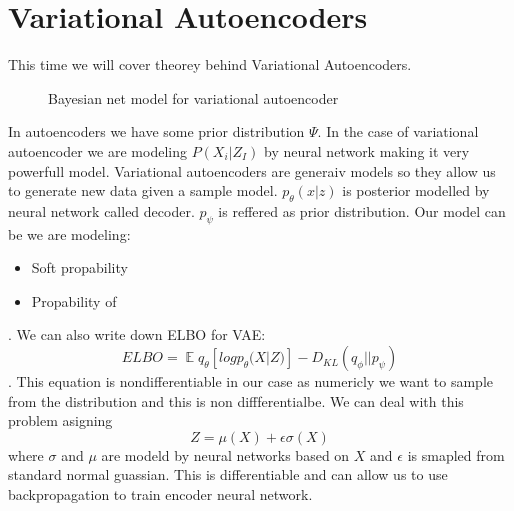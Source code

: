 \documentclass[12pt,a4paper]{article}
\DeclareMathOperator{\EX}{\mathbb{E}}%
\begin{document}
\section{Variational Autoencoders}
This time we will cover theorey behind Variational Autoencoders.
\begin{figure}[H]\label{var_enc}
    \centering
    \caption{Bayesian net model for variational autoencoder}
\end{figure}
In autoencoders we have some prior distribution $\Psi$. In the case of variational autoencoder we are modeling $P(X_i|Z_I)$ by neural network making it very powerfull model. Variational autoencoders
are generaiv models so they allow us to generate new data given a sample model. $p_\theta(x|z)$ is posterior modelled by neural network called {\italic decoder}. $p_\psi$ is reffered as
prior distribution.
Our model can be we are modeling:
\begin{itemize}
    \item Soft propability 
    \item Propability of 
\end{itemize}. We can also write down ELBO for VAE:
\begin{equation}
ELBO=\EX{q_\theta} [log{p_\theta(X|Z})]-D_{KL}(q_\phi||p_\psi)
\end{equation}. This equation is nondifferentiable in our case as numericly we want to sample from the distribution and this is non diffferentialbe. We can deal with this problem
asigning 
\begin{equation}
    Z=\mu(X)+\epsilon \sigma(X)
\end{equation}
where $\sigma$ and $\mu$ are modeld by neural networks based on $X$ and $\epsilon$ is smapled from standard normal guassian. This is differentiable and can allow us to use backpropagation to 
train encoder neural network.
\end{document}
